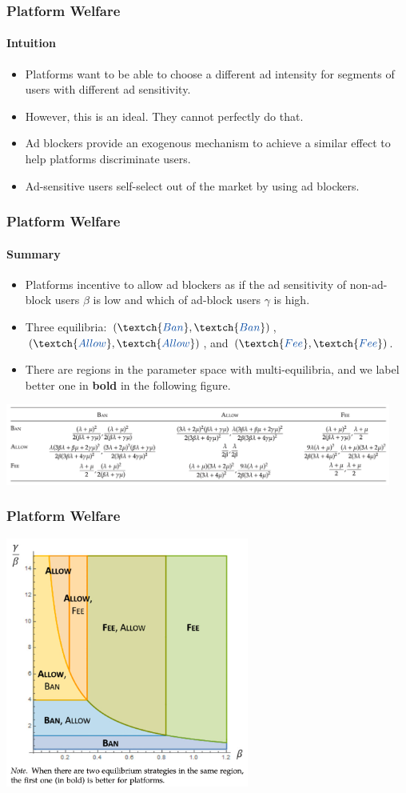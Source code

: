 \documentclass{beamer}
\newcommand{\hl}[1]{\textcolor{myblue}{#1}}
\newcommand{\ban}{\textch{\textcolor{myblue}{Ban}}}
\newcommand{\al}{\textch{\textcolor{myblue}{Allow}}}
\newcommand{\fee}{\textch{\textcolor{myblue}{Fee}}}
\begin{document}
\begin{frame}
    \frametitle{Platform Welfare}
    \framesubtitle{Intuition}
    \begin{itemize}
        \item Platforms want to be able to choose a different ad intensity 
            for segments of users with different ad sensitivity.
        \item However, this is an ideal. They cannot perfectly do that.
        \item \hl{Ad blockers provide an exogenous mechanism 
                to achieve a similar effect
            to help platforms discriminate users.}
        \item Ad-sensitive users self-select out of the market by using ad blockers.
    \end{itemize}
\end{frame}

\begin{frame}
    \frametitle{Platform Welfare}
    \framesubtitle{Summary}
    \begin{itemize}
        \item Platforms incentive to allow ad blockers
            \hl{as if the ad sensitivity of non-ad-block users $\beta$ is low
            and which of ad-block users $\gamma$ is high}.
        \item Three equilibria: $(\ban,\ban)$, $(\al,\al)$, and $(\fee,\fee)$.
        \item There are regions in the parameter space 
            with multi-equilibria,
            and we label better one in {\bf bold} in the following figure.
    \end{itemize}
    \centering
    \includegraphics[width=0.95\textwidth]{platformpayoff}
\end{frame}

\begin{frame}
    \frametitle{Platform Welfare}
    \centering
    \includegraphics[width=0.6\textwidth]{platreg}
\end{frame}
\end{document}
